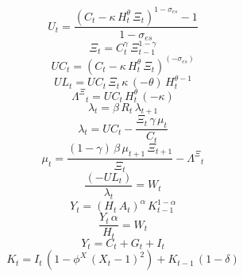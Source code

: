 \begin{dmath}
{U}_{t}=\frac{\left({C}_{t}-{{\kappa}}\, {H}_{t}^{{{\theta}}}\, {{\Xi}}_{t}\right)^{1-{{\sigma_{es}}}}-1}{1-{{\sigma_{es}}}}
\end{dmath}
\begin{dmath}
{{\Xi}}_{t}={C}_{t}^{{{\gamma}}}\, {{\Xi}}_{t-1}^{1-{{\gamma}}}
\end{dmath}
\begin{dmath}
{UC}_{t}=\left({C}_{t}-{{\kappa}}\, {H}_{t}^{{{\theta}}}\, {{\Xi}}_{t}\right)^{\left(-{{\sigma_{es}}}\right)}
\end{dmath}
\begin{dmath}
{UL}_{t}={UC}_{t}\, {{\Xi}}_{t}\, {{\kappa}}\, \left(-{{\theta}}\right)\, {H}_{t}^{{{\theta}}-1}
\end{dmath}
\begin{dmath}
{{\Lambda^{\Xi}}}_{t}={UC}_{t}\, {H}_{t}^{{{\theta}}}\, \left(-{{\kappa}}\right)
\end{dmath}
\begin{dmath}
{{\lambda}}_{t}={{\beta}}\, {R}_{t}\, {{\lambda}}_{t+1}
\end{dmath}
\begin{dmath}
{{\lambda}}_{t}={UC}_{t}-\frac{{{\Xi}}_{t}\, {{\gamma}}\, {{\mu}}_{t}}{{C}_{t}}
\end{dmath}
\begin{dmath}
{{\mu}}_{t}=\frac{\left(1-{{\gamma}}\right)\, {{\beta}}\, {{\mu}}_{t+1}\, {{\Xi}}_{t+1}}{{{\Xi}}_{t}}-{{\Lambda^{\Xi}}}_{t}
\end{dmath}
\begin{dmath}
\frac{\left(-{UL}_{t}\right)}{{{\lambda}}_{t}}={W}_{t}
\end{dmath}
\begin{dmath}
{Y}_{t}=\left({H}_{t}\, {A}_{t}\right)^{{{\alpha}}}\, {K}_{t-1}^{1-{{\alpha}}}
\end{dmath}
\begin{dmath}
\frac{{Y}_{t}\, {{\alpha}}}{{H}_{t}}={W}_{t}
\end{dmath}
\begin{dmath}
{Y}_{t}={C}_{t}+{G}_{t}+{I}_{t}
\end{dmath}
\begin{dmath}
{K}_{t}={I}_{t}\, \left(1-{{\phi^X}}\, \left({X}_{t}-1\right)^{2}\right)+{K}_{t-1}\, \left(1-{{\delta}}\right)
\end{dmath}
